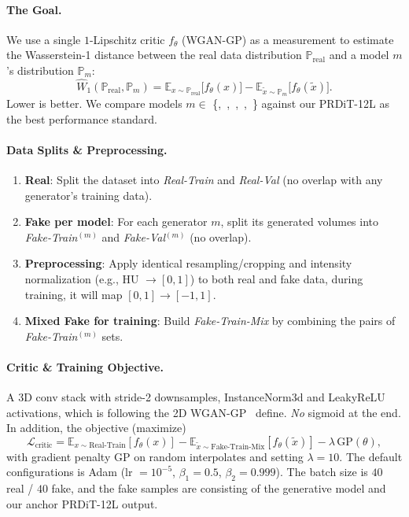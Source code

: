 \paragraph{The Goal.} We use a single $1$-Lipschitz critic $f_\theta$ (WGAN-GP) as a measurement to estimate the Wasserstein-1 distance between the real data distribution $\mathbb{P}_\text{real}$ and a model $m$'s distribution $\mathbb{P}_m$:
\begin{equation}
\widehat{W}_1(\mathbb{P}_\text{real}, \mathbb{P}_m)
= \mathbb{E}_{x \sim \mathbb{P}_\text{real}} \big[f_\theta(x)\big]
- \mathbb{E}_{\tilde{x} \sim \mathbb{P}_m} \big[f_\theta(\tilde{x})\big].
\end{equation}
Lower is better. We compare models $m \in$ \{,\ ,\ ,\ ,\ \} against our PRDiT-12L as the best performance standard.
\paragraph{Data Splits \& Preprocessing.}
\begin{enumerate}
\item \textbf{Real}: Split the dataset into \emph{Real-Train} and \emph{Real-Val} (no overlap with any generator's training data).
\item \textbf{Fake per model}: For each generator $m$, split its generated volumes into \emph{Fake-Train}$^{(m)}$ and \emph{Fake-Val}$^{(m)}$ (no overlap).
\item \textbf{Preprocessing}: Apply identical resampling/cropping and intensity normalization (e.g., HU $\to [0,1]$) to both real and fake data, during training, it will map $[0,1] \to [-1,1]$.
\item \textbf{Mixed Fake for training}: Build \emph{Fake-Train-Mix} by combining the pairs of \emph{Fake-Train}$^{(m)}$ sets.
\end{enumerate}
\paragraph{Critic \& Training Objective.}
A 3D conv stack with stride-2 downsamples, InstanceNorm3d and LeakyReLU activations, which is following the 2D WGAN-GP~\citep{gulrajani2017improved} define. \emph{No} sigmoid at the end. 
In addition, the objective (maximize)
\begin{equation}
\mathcal{L}_\text{critic}
= \mathbb{E}_{x \sim \text{Real-Train}}[f_\theta(x)]
- \mathbb{E}_{\tilde{x} \sim \text{Fake-Train-Mix}}[f_\theta(\tilde{x})]
- \lambda\,\mathrm{GP}(\theta),
\end{equation}
with gradient penalty $\mathrm{GP}$ on random interpolates and setting $\lambda=10$.
The default configurations is Adam (lr $=10^{-5}$, $\beta_1{=}0.5$, $\beta_2{=}0.999$). The batch size is $40$ real / $40$ fake, and the fake samples are consisting of the generative model and our anchor PRDiT-12L output.

